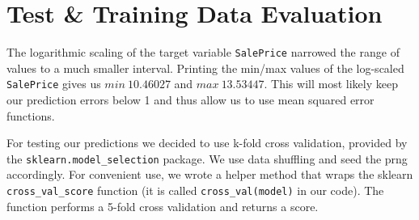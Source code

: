 \section{Test \& Training Data Evaluation}

The logarithmic scaling of the target variable \texttt{SalePrice} narrowed the range of values to a much smaller interval. Printing the min/max values of the log-scaled \texttt{SalePrice} gives us $min~10.46027$ and $max~13.53447$. This will most likely keep our prediction errors below 1 and thus allow us to use mean squared error functions.

For testing our predictions we decided to use k-fold cross validation, provided by the \texttt{sklearn.model\_selection} package. We use data shuffling and seed the prng accordingly. For convenient use, we wrote a helper method that wraps the sklearn \texttt{cross\_val\_score} function (it is called \texttt{cross\_val(model)} in our code). The function performs a 5-fold cross validation and returns a score.